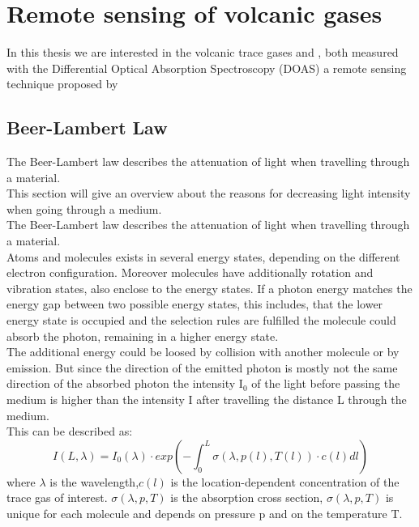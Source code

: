 \documentclass  [
  paper    = a4,
  BCOR     = 10mm,
  twoside,
  fontsize = 12pt,
  fleqn,
  toc      = bibnumbered,
  toc      = listofnumbered,
  numbers  = noendperiod,
  headings = normal,
  listof   = leveldown,
  version  = 3.03
]                                       {scrreprt}
\begin{document}
	\chapter{Remote sensing of volcanic gases}

	In this thesis we are interested in the volcanic trace gases  and , both measured with the Differential Optical Absorption Spectroscopy (DOAS) a remote sensing technique proposed by \citet{platt1980observations}

	

	\section*{Beer-Lambert Law}
	The Beer-Lambert law describes the attenuation of light when travelling through a material.\\
	This section will give an overview about the reasons for decreasing light intensity when going through a medium.\\
	The Beer-Lambert law describes the attenuation of light when travelling through a material.\\
%
	Atoms and molecules exists in several energy states, depending on the different electron configuration. Moreover molecules have additionally rotation and vibration states, also enclose to the energy states. If a photon energy matches the energy gap between two possible energy states, this includes, that the lower energy state is occupied and the selection rules are fulfilled  the molecule could absorb the photon, remaining in a higher energy state.\\
	The additional energy could be loosed by collision with another molecule or by emission. But since the direction of the emitted photon is mostly not the same direction of the absorbed photon the intensity I$_{0}$ of the light before passing the medium is higher than the intensity I after travelling the distance L through the medium.\\
	This can be described as:\\ 
	\begin{equation}
	I\left(L,\lambda\right) = I_{0}\left(\lambda\right)\cdot exp\left(-\int^{L}_{0}\sigma\left(\lambda,p(l),T(l)\right)\cdot c\left(l\right)dl\right)
	\end{equation}
	where $\lambda$ is the wavelength,$c\left(l\right)$ is the location-dependent concentration of the trace gas of interest. $\sigma\left(\lambda,p,T\right)$ is the absorption cross section, $\sigma\left(\lambda,p,T\right)$ is unique for each molecule and depends on pressure p and on the temperature T.\\
\end{document}
